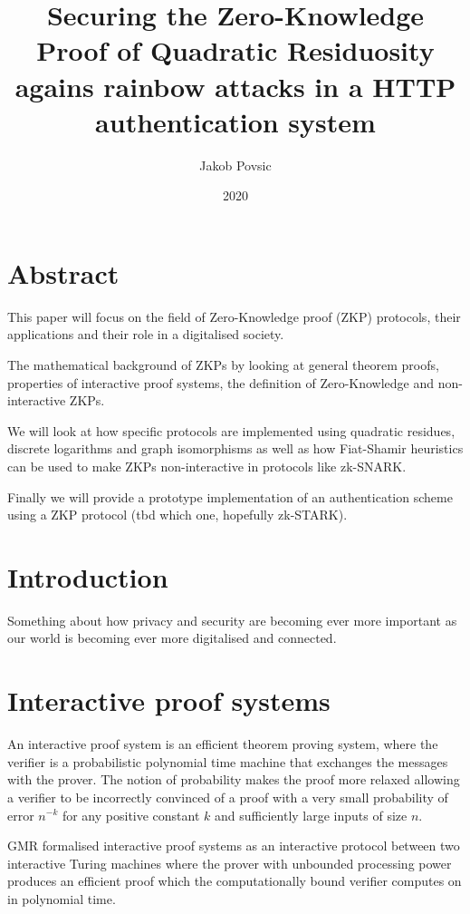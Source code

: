 \documentclass[12pt,a4paper]{article}
\title{Securing the Zero-Knowledge Proof of Quadratic Residuosity agains rainbow attacks in a HTTP authentication system}
\author{Jakob Povsic}
\date{2020}
\begin{document}

\maketitle
\newpage

\tableofcontents
\newpage

\section*{Abstract}
This paper will focus on the field of Zero-Knowledge proof (ZKP) protocols, their applications and their role in a digitalised society.

The mathematical background of ZKPs by looking at general theorem proofs, properties of interactive proof systems, the definition of Zero-Knowledge and non-interactive ZKPs.

We will look at how specific protocols are implemented using quadratic residues, discrete logarithms and graph isomorphisms as well as how Fiat-Shamir heuristics can be used to make ZKPs non-interactive in protocols like zk-SNARK.

Finally we will provide a prototype implementation of an authentication scheme using a ZKP protocol (tbd which one, hopefully zk-STARK).
\newpage

\section{Introduction}
Something about how privacy and security are becoming ever more important as our world is becoming ever more digitalised and connected.

\section{Interactive proof systems}
An interactive proof system is an efficient theorem proving system, where the verifier is a probabilistic polynomial time machine that exchanges the messages with the prover. The notion of probability makes the proof more relaxed allowing a verifier to be incorrectly convinced of a proof with a very small probability of error $n^{-k}$ for any positive constant $k$ and sufficiently large inputs of size $n$.

GMR \cite{10.1145/22145.22178} formalised interactive proof systems as an interactive protocol between two interactive Turing machines where the prover with unbounded processing power produces an efficient proof which the computationally bound verifier computes on in polynomial time.
\end{document}
